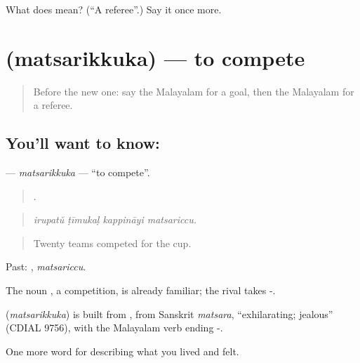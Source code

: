 \begin{tcolorbox}[breakable,colback=teal!4,colframe=teal!35!black,title={Before you move on}]
What does  mean? (\textquotedblleft{}A referee\textquotedblright{}.) Say it once more.
\end{tcolorbox}
\section[\texorpdfstring{\ml{മത്സരിക്കുക} (matsarikkuka)}{മത്സരിക്കുക (matsarikkuka)}]{ (matsarikkuka) — to compete}

\label{lesson:ML-C568-matsarikkuka}



\begin{quote}
Before the new one: say the Malayalam for a goal, then the Malayalam for a referee.
\end{quote}

\subsection*{You'll want to know: }
\textbf{} — \emph{matsarikkuka} — \textquotedblleft{}to compete\textquotedblright{}.

\begin{quote}
   .
\end{quote}

\begin{quote}
\emph{irupatŭ ṭīmukaḷ kappināyi matsariccu.}
\end{quote}

\begin{quote}
Twenty teams competed for the cup.
\end{quote}

Past: , \emph{matsariccu}.

The noun , a competition, is already familiar; the rival takes -.

\begin{cousinweb}
\textbf{} (\emph{matsarikkuka}) is built from , from Sanskrit \emph{matsara}, \textquotedblleft{}exhilarating; jealous\textquotedblright{} (CDIAL 9756), with the Malayalam verb ending -.
\end{cousinweb}

\begin{grammarlens}[title={What you've built}]
One more word for describing what you lived and felt.
\end{grammarlens}

